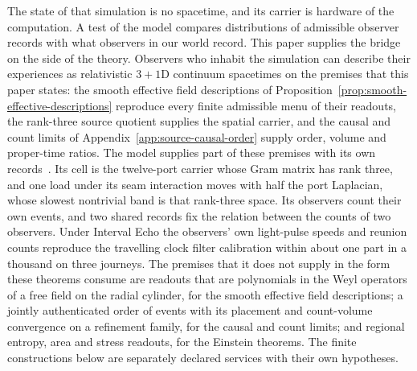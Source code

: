 \documentclass[11pt]{article}
\begin{document}
The state of that simulation is no spacetime, and its carrier is hardware of
the computation. A test of the model compares distributions of admissible
observer records with what observers in our world record. This paper
supplies the bridge on the side of the theory. Observers who inhabit the
simulation can describe their experiences as relativistic $3{+}1$D continuum
spacetimes on the premises that this paper states: the smooth effective field
descriptions of
Proposition~\ref{prop:smooth-effective-descriptions} reproduce every finite
admissible menu of their readouts, the rank-three source quotient supplies
the spatial carrier, and the causal and count limits of
Appendix~\ref{app:source-causal-order} supply order, volume and proper-time
ratios. The model supplies part of these premises with its own
records~\cite{ophmodel}. Its cell is the twelve-port carrier whose Gram
matrix has rank three, and one load under its seam interaction moves with
half the port Laplacian, whose slowest nontrivial band is that rank-three
space. Its observers count their own events, and two shared records fix the
relation between the counts of two observers. Under Interval Echo the
observers' own light-pulse speeds and reunion counts reproduce the travelling clock filter calibration within about one part in a
thousand on three journeys. The premises that it does not supply in the form
these theorems consume are readouts that are polynomials in the Weyl
operators of a free field on the radial cylinder, for the smooth effective
field descriptions; a jointly authenticated order of events with its
placement and count-volume convergence on a refinement family, for the
causal and count limits; and regional entropy, area and stress readouts, for
the Einstein theorems. The finite constructions
below are separately declared services with their own hypotheses.
\end{document}
